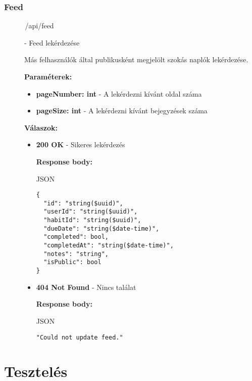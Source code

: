\documentclass[12pt]{report}
\newcommand{\httpGet}[1]{\colorbox{getColor}{\textbf{\textcolor{white}{GET}}}~#1}
\begin{document}
\subsection{Feed}
\begin{description}
  \item[\httpGet{/api/feed}] - Feed lekérdezése
  
    \vspace{0.5cm}
    Más felhasználók által publikusként megjelölt szokás naplók lekérdezése.

    \vspace{0.5cm}
    \textbf{Paraméterek:}
    \begin{itemize}
      \item \textbf{pageNumber: int} - A lekérdezni kívánt oldal száma
      \item \textbf{pageSize: int} - A lekérdezni kívánt bejegyzések száma
    \end{itemize}

    \vspace{0.5cm}
    \textbf{Válaszok:}
    \begin{itemize}
      \item \textbf{200 OK} - Sikeres lekérdezés

        \textbf{Response body:}
        \begin{codeblock}{JSON}
          \begin{verbatim}
{
  "id": "string($uuid)",
  "userId": "string($uuid)",
  "habitId": "string($uuid)",
  "dueDate": "string($date-time)",
  "completed": bool,
  "completedAt": "string($date-time)",
  "notes": "string",
  "isPublic": bool
}
          \end{verbatim}
        \end{codeblock}

      \item \textbf{404 Not Found} - Nincs találat
      
        \textbf{Response body:}
        \begin{codeblock}{JSON}
          \begin{verbatim}
"Could not update feed."
          \end{verbatim}
        \end{codeblock}
    \end{itemize}
\end{description}

\chapter{Tesztelés}
\end{document}

